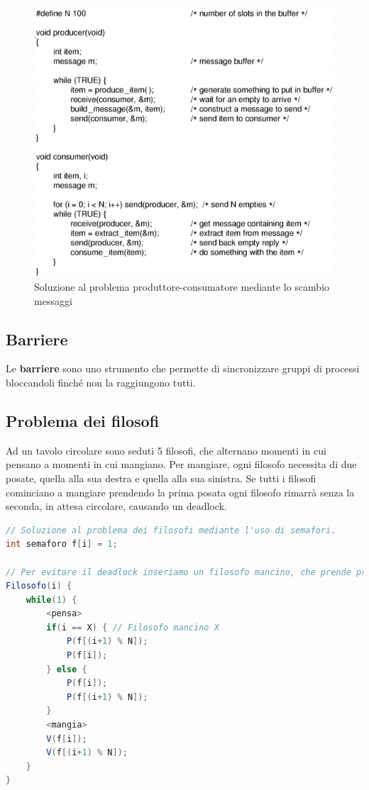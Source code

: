 \documentclass{article}
\begin{document}
\begin{figure}[H]
    \centering
    \includegraphics[scale=0.5]{solproduttoreconsumatore2.png}
    \caption{Soluzione al problema produttore-consumatore mediante lo scambio messaggi}
    \label{fig:sol-prod-cons-mes}
\end{figure}

\subsection{Barriere} Le \textbf{barriere} sono uno strumento che permette di sincronizzare gruppi di processi bloccandoli finché non la raggiungono tutti.

\subsection{Problema dei filosofi} Ad un tavolo circolare sono seduti 5 filosofi, che alternano momenti in cui pensano a momenti in cui mangiano. Per mangiare, ogni filosofo necessita di due posate, quella alla sua destra e quella alla sua sinistra. Se tutti i filosofi cominciano a mangiare prendendo la prima posata ogni filosofo rimarrà senza la seconda, in attesa circolare, causando un deadlock.

\begin{lstlisting}[language=java]
// Soluzione al problema dei filosofi mediante l'uso di semafori.
int semaforo f[i] = 1;

// Per evitare il deadlock inseriamo un filosofo mancino, che prende prima la posata sinistra e poi quella destra
Filosofo(i) {
    while(1) {
        <pensa>
        if(i == X) { // Filosofo mancino X
            P(f[(i+1) % N]);
            P(f[i]);
        } else {
            P(f[i]);
            P(f[(i+1) % N]);
        }
        <mangia>
        V(f[i]);
        V(f[(i+1) % N]);
    }
}
\end{lstlisting}
\end{document}
